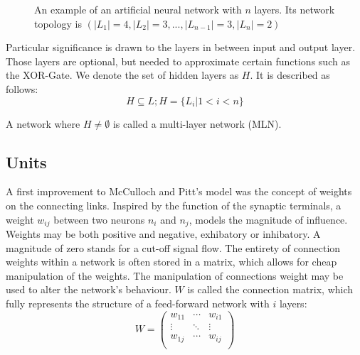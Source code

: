 \documentclass[10pt,a4paper,DIV=11]{scrreprt}
\let\oldemptyset\emptyset
\let\emptyset\varnothing
\begin{document}
\begin{figure}
\caption{An example of an artificial neural network with $n$ layers. Its network topology is $(|L_1|=4,|L_2|=3,...,|L_{n-1}|=3,|L_n|=2)$}
\label{fig:layer}
\end{figure}

Particular significance is drawn to the layers in between input and output layer. Those layers are optional, but needed to approximate certain 
functions such as the XOR-Gate. 
We denote the set of hidden layers as $H$. It is described as follows:
\begin{equation}
H \subseteq L; H = \{L_i|1<i<n\}
\end{equation} 

A network where $H \neq \oldemptyset$ is called a multi-layer network (MLN). 

\subsection{Units}
\label{subsec:weights}

A first improvement to McCulloch and Pitt's model was the concept of weights on the connecting links. Inspired by the function of the synaptic 
terminals, a weight $w_{ij}$ between two neurons $n_i$ and $n_j$, models the magnitude of influence. Weights may be both positive and negative, 
exhibatory or inhibatory. A magnitude of zero stands for a cut-off signal flow. The entirety of connection weights within a network is often stored 
in a matrix, which allows for cheap manipulation of the weights. 
The manipulation of connections weight may be used to alter the network's behaviour. $W$ is called the connection matrix, which fully represents 
the structure of a feed-forward network with $i$ layers:
\begin{equation}
W = 
\begin{pmatrix}
w_{11} & \cdots & w_{i1} \\
\vdots & \ddots & \vdots \\
w_{1j} & \cdots & w_{ij} \\
\end{pmatrix}
\end{equation}
\end{document}

